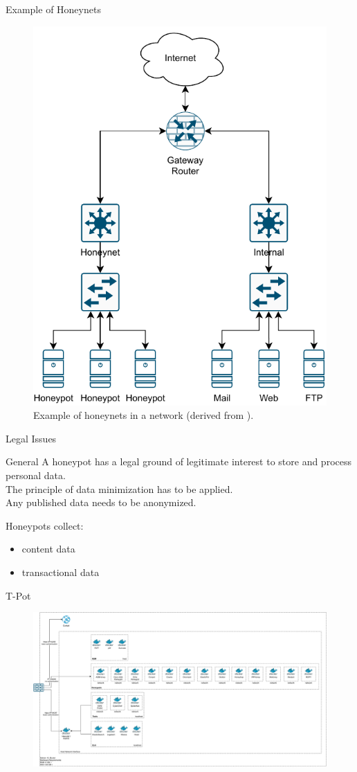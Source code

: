 \begin{frame}{Example of Honeynets}
    \begin{figure}
        \centering
        \includegraphics[width=0.5\columnwidth]{img/honeynet-example.pdf}
        \caption[Example of honeynets in a network]{
            Example of honeynets in a network (derived from \cite{Spitzner2003}).
        }
    \end{figure}
\end{frame}

\begin{frame}{Legal Issues}
    \begin{block}{General}
        A honeypot has a legal ground of legitimate interest to store and process personal data.\\
        The principle of data minimization has to be applied.\\
        Any published data needs to be anonymized.\\
        \cite{sokol2017}
    \end{block}
    Honeypots collect:
    \begin{itemize}
        \item content data
        \item transactional data 
    \end{itemize}
\end{frame}

\begin{frame}{T-Pot}
    \begin{figure}
        \centering
        \includegraphics[width=\columnwidth]{img/tpot-architecture.pdf}
    \end{figure}
\end{frame}

